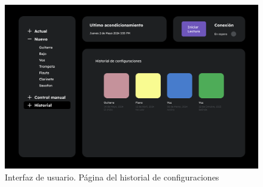 \hfill\break
\begin{figure}[!htb]
    \centering
    \includegraphics[width=\linewidth]{imagenes/Historial.png}
    \caption{\footnotesize Interfaz de usuario. Página del historial de configuraciones}
    \label{fig:DecayCurve}
\end{figure}
\FloatBarrier
